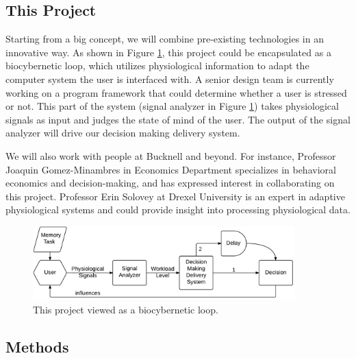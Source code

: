 \documentclass[12pt]{article}
\begin{document}
\subsection{This Project}\label{this-project}


Starting from a big concept, we will combine pre-existing technologies in an innovative way. As shown in Figure \ref{figure:mindmap}, this project could be encapsulated as a biocybernetic loop, which utilizes physiological information to adapt the computer system the user is interfaced with. A senior design team is currently working on a program framework that could determine whether a user is stressed or not. This part of the system (signal analyzer in Figure \ref{figure:mindmap}) takes physiological signals as input and judges the state of mind of the user. The output of the signal analyzer will drive our decision making delivery system.

We will also work with people at Bucknell and beyond. For instance, Professor Joaquin Gomez-Minambres in Economics Department specializes in behavioral economics and decision-making, and has expressed interest in collaborating on this project. Professor Erin Solovey at Drexel University is an expert in adaptive physiological systems and could provide insight into processing physiological data.

\begin{figure}[h]
\centering
\includegraphics[width=0.9\textwidth]{hci_mindmap.pdf}
\caption{This project viewed as a biocybernetic loop.}
\label{figure:mindmap}
\end{figure}




\subsection{Methods}\label{methods}
\end{document}
